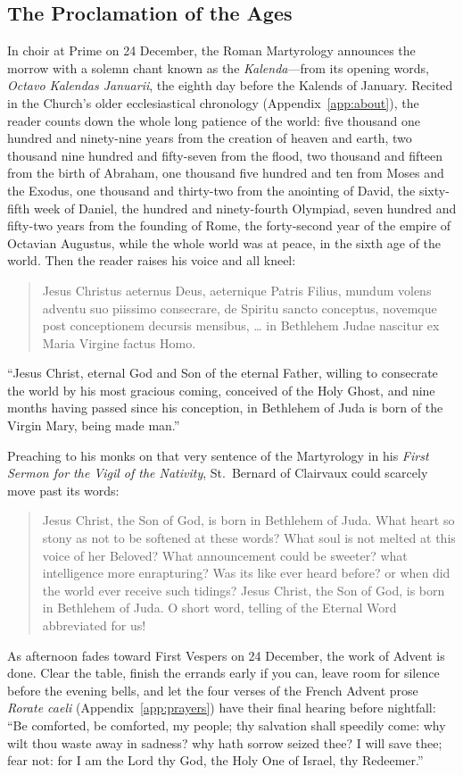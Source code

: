\subsection{The Proclamation of the Ages}

In choir at Prime on 24 December, the Roman Martyrology announces the morrow
with a solemn chant known as the \textit{Kalenda}---from its opening words,
\textit{Octavo Kalendas Januarii}, the eighth day before the Kalends of
January. Recited in the Church's older ecclesiastical chronology
(Appendix~\ref{app:about}), the reader counts down the whole long patience of
the world: five thousand one hundred and ninety-nine years from the creation of
heaven and earth, two thousand nine hundred and fifty-seven from the flood, two
thousand and fifteen from the birth of Abraham, one thousand five hundred and
ten from Moses and the Exodus, one thousand and thirty-two from the anointing
of David, the sixty-fifth week of Daniel, the hundred and ninety-fourth
Olympiad, seven hundred and fifty-two years from the founding of Rome, the
forty-second year of the empire of Octavian Augustus, while the whole world was
at peace, in the sixth age of the world. Then the reader raises his voice and
all kneel:

\begin{quote}
Jesus Christus aeternus Deus, aeternique Patris Filius, mundum volens adventu
suo piissimo consecrare, de Spiritu sancto conceptus, novemque post
conceptionem decursis mensibus, \ldots{} in Bethlehem Judae nascitur ex Maria
Virgine factus Homo.
\end{quote}

``Jesus Christ, eternal God and Son of the eternal Father, willing to
consecrate the world by his most gracious coming, conceived of the Holy Ghost,
and nine months having passed since his conception, in Bethlehem of Juda is
born of the Virgin Mary, being made man.''

Preaching to his monks on that very sentence of the Martyrology in his
\textit{First Sermon for the Vigil of the Nativity}, St.~Bernard of Clairvaux
could scarcely move past its words:

\begin{quote}
Jesus Christ, the Son of God, is born in Bethlehem of Juda. What heart so stony
as not to be softened at these words? What soul is not melted at this voice of
her Beloved? What announcement could be sweeter? what intelligence more
enrapturing? Was its like ever heard before? or when did the world ever receive
such tidings? Jesus Christ, the Son of God, is born in Bethlehem of Juda. O
short word, telling of the Eternal Word abbreviated for us!
\end{quote}

As afternoon fades toward First Vespers on 24 December, the work of Advent is
done. Clear the table, finish the errands early if you can, leave room for
silence before the evening bells, and let the four verses of the French Advent
prose \textit{Rorate caeli} (Appendix~\ref{app:prayers}) have their final
hearing before nightfall: ``Be comforted, be comforted, my people; thy
salvation shall speedily come: why wilt thou waste away in sadness? why hath
sorrow seized thee? I will save thee; fear not: for I am the Lord thy God, the
Holy One of Israel, thy Redeemer.''
